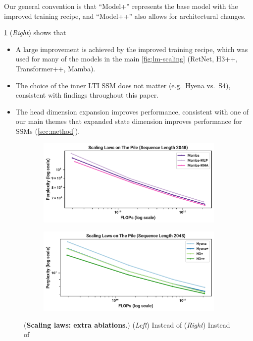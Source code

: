 Our general convention is that ``Model+'' represents the base model with the improved training recipe,
and ``Model++'' also allows for architectural changes.

\cref{fig:lm-scaling-ablations} (\emph{Right}) shows that
\begin{itemize}[leftmargin=*,itemsep=0pt]
  \item A large improvement is achieved by the improved training recipe, which was used for many of the models in the main \cref{fig:lm-scaling} (RetNet, H3++, Transformer++, Mamba).
  \item The choice of the inner LTI SSM does not matter (e.g.\ Hyena vs.\ S4), consistent with findings throughout this paper.
  \item The head dimension expansion improves performance, consistent with one of our main themes that expanded state dimension improves performance for SSMs (\cref{sec:method}).
\end{itemize}


\begin{figure}[!t]
  \centering
  \begin{subfigure}[t]{0.49\linewidth}
    \centering
    \includegraphics[width=\textwidth]{fig/pile_2k_ablations_mamba.pdf}
  \end{subfigure}
  \begin{subfigure}[t]{0.49\linewidth}
    \centering
    \includegraphics[width=\textwidth]{fig/pile_2k_ablations_h3.pdf}
  \end{subfigure}
  \caption{
    (\textbf{Scaling laws: extra ablations}.) %
    (\emph{Left}) Instead of 
    (\emph{Right}) Instead of 
  }
  \label{fig:lm-scaling-ablations}
\end{figure}

